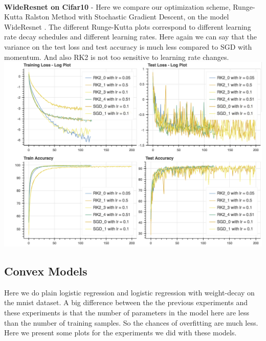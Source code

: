 \\
\textbf{WideResnet on Cifar10} -
Here we compare our optimization scheme, Runge-Kutta Ralston Method with Stochastic Gradient Descent, on the model WideResnet \cite{bl_2}. The different Runge-Kutta plots correspond to different learning rate decay schedules and different learning rates. Here again we can say that the variance on the test loss and test accuracy is much less compared to SGD with momentum. And also RK2 is not too sensitive to learning rate changes.
\\
\includegraphics[scale=0.4]{plots/inf_plots/wideResnet_rk2_sgd.png}


\subsection{Convex Models}

Here we do plain logistic regression and logistic regression with weight-decay on the mnist dataset. A big difference between the the previous experiments and these experiments is that the number of parameters in the model here are less than the number of training samples. So the chances of overfitting are much less. Here we present some plots for the experiments we did with these models.

